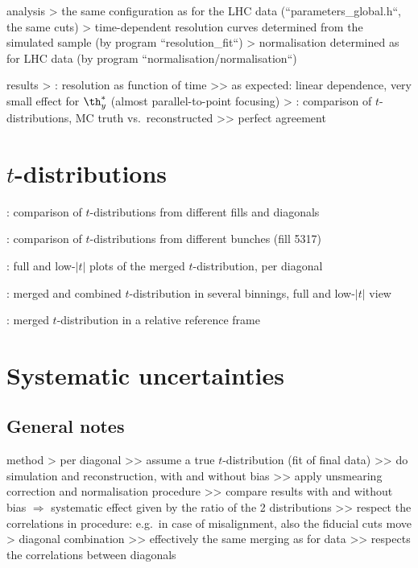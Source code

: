 \> analysis
\>> the same configuration as for the LHC data (``parameters\_global.h``, the same cuts)
\>> time-dependent resolution curves determined from the simulated sample (by program ``resolution\_fit``)
\>> normalisation determined as for LHC data (by program ``normalisation/normalisation``)

\> results
\>>  : resolution as function of time
\>>> as expected: linear dependence, very small effect for $\th_y^*$ (almost parallel-to-point focusing)
\>>  : comparison of $t$-distributions, MC truth vs.\ reconstructed
\>>> perfect agreement



\chapter[t-distributions]{$t$-distributions}

\>  : comparison of $t$-distributions from different fills and diagonals

\>  : comparison of $t$-distributions from different bunches (fill 5317)

\>  : full and low-$|t|$ plots of the merged $t$-distribution, per diagonal

\>  : merged and combined $t$-distribution in several binnings, full and low-$|t|$ view

\>  : merged $t$-distribution in a relative reference frame



\chapter[systematics]{Systematic uncertainties}

\section[systematics-general]{General notes}

\> method
\>> per diagonal
\>>> assume a true $t$-distribution (fit of final data)
\>>> do simulation and reconstruction, with and without bias
\>>> apply unsmearing correction and normalisation procedure
\>>> compare results with and without bias $\Rightarrow$ systematic effect given by the ratio of the 2 distributions
\>>> respect the correlations in procedure: e.g.~in case of misalignment, also the fiducial cuts move
\>> diagonal combination
\>>> effectively the same merging as for data
\>>> respects the correlations between diagonals

